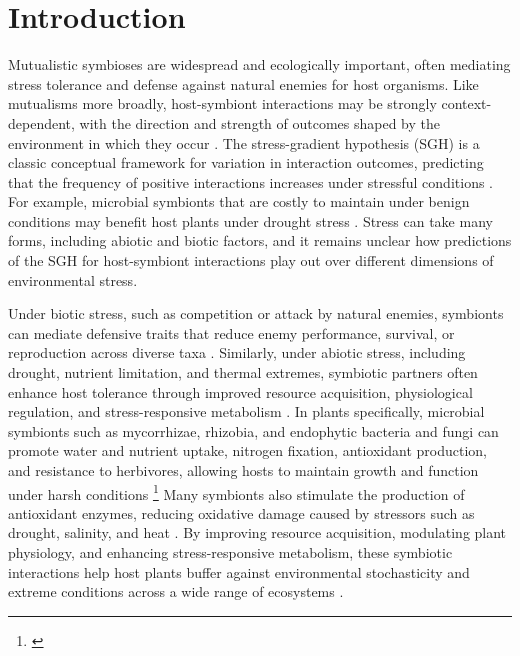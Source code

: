 \documentclass[12pt]{article}\usepackage[]{graphicx}\usepackage[dvipsnames]{xcolor}
\newcommand{\tom}[2]{{\color{red}{#1}}\footnote{\textit{\color{red}{#2}}}}
\begin{document}
\section*{Introduction}
Mutualistic symbioses are widespread and ecologically important, often mediating stress tolerance and defense against natural enemies for host organisms. 
Like mutualisms more broadly, host-symbiont interactions may be strongly context-dependent, with the direction and strength of outcomes shaped by the environment in which they occur \citep{hoeksema2015context, bronstein1994conditional,hoang2024impacts,rudgers2020climate}. 
The stress-gradient hypothesis (SGH) is a classic conceptual framework for variation in interaction outcomes, predicting that the frequency of positive interactions increases under stressful conditions \citep{louthan2015and,bertness1994positive,holmgren2010strong,maestre2009refining}.
For example, microbial symbionts that are costly to maintain under benign conditions may benefit host plants under drought stress  \citep{giauque2019endophyte}. 
Stress can take many forms, including abiotic and biotic factors, and it remains unclear how predictions of the SGH for host-symbiont interactions play out over different dimensions of environmental stress. 

Under biotic stress, such as competition or attack by natural enemies, symbionts can mediate defensive traits that reduce enemy performance, survival, or reproduction across diverse taxa \citep{atala2022fungal,bastias2017epichloe,vega2008insect,haine2008symbiont,florez2015defensive}.
Similarly, under abiotic stress, including drought, nutrient limitation, and thermal extremes, symbiotic partners often enhance host tolerance through improved resource acquisition, physiological regulation, and stress-responsive metabolism \citep{clay2002evolutionary, afkhami2008symbiosis,cesar2024defensive}. 
In plants specifically, microbial symbionts such as mycorrhizae, rhizobia, and endophytic bacteria and fungi can promote water and nutrient uptake, nitrogen fixation, antioxidant production, and resistance to herbivores, allowing hosts to maintain growth and function under harsh conditions \tom{\citep{amijee1989development}.}{I would beef up references to match the content of this sentence.}
Many symbionts also stimulate the production of antioxidant enzymes, reducing oxidative damage caused by stressors such as drought, salinity, and heat \citep{ruiz1996superoxide}. 
By improving resource acquisition, modulating plant physiology, and enhancing stress-responsive metabolism, these symbiotic interactions help host plants buffer against environmental stochasticity and extreme conditions across a wide range of ecosystems \citep{fowler2023geographic,rudgers2020climate,li2026climate}.
\end{document}
